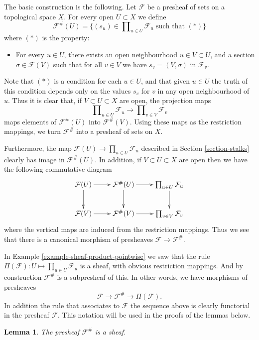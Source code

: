\documentclass{stacks-project}
\theoremstyle{plain}
\newtheorem{lemma}[subsection]{Lemma}
\theoremstyle{definition}
\theoremstyle{remark}
\numberwithin{equation}{subsection}
\begin{document}
\medskip\noindent
The basic construction is the following. Let $\mathcal{F}$ be a presheaf
of sets on a topological space $X$.
For every open $U \subset X$ we define
$$
\mathcal{F}^{\#}(U)
=
\{
(s_u) \in \prod\nolimits_{u \in U} \mathcal{F}_u
\text{ such that }(*)
\}
$$
where $(*)$ is the property:
\begin{itemize}
\item[(*)] For every $u \in U$, there exists an open neighbourhood
$u \in V \subset U$, and a section $\sigma \in \mathcal{F}(V)$
such that for all $v \in V$ we have $s_v = (V, \sigma)$
in $\mathcal{F}_v$.
\end{itemize}
Note that $(*)$ is a condition for each $u \in U$,
and that given $u \in U$ the truth of this condition
depends only on the values $s_v$ for $v$ in any open neighbourhood
of $u$. Thus it is clear that,
if $V \subset U \subset X$ are open, the projection maps
$$
\prod\nolimits_{u \in U} \mathcal{F}_u
\longrightarrow
\prod\nolimits_{v \in V} \mathcal{F}_v
$$
maps elements of $\mathcal{F}^{\#}(U)$ into $\mathcal{F}^{\#}(V)$.
Using these maps as the restriction mappings, we turn $\mathcal{F}^\#$
into a presheaf of sets on $X$.

\medskip\noindent
Furthermore, the map $\mathcal{F}(U) \to \prod_{u \in U} \mathcal{F}_u$
described in Section \ref{section-stalks} clearly has image
in $\mathcal{F}^{\#}(U)$. In addition, if $V \subset U \subset X$ are
open then we have the following commutative diagram
$$
\xymatrix{
\mathcal{F}(U) \ar[r] \ar[d] &
\mathcal{F}^{\#}(U) \ar[r] \ar[d] &
\prod_{u\in U} \mathcal{F}_u \ar[d] \\
\mathcal{F}(V) \ar[r] &
\mathcal{F}^{\#}(V) \ar[r] &
\prod_{v\in V} \mathcal{F}_v
}
$$
where the vertical maps are induced from the
restriction mappings. Thus we see that
there is a canonical morphism of presheaves
$\mathcal{F} \to \mathcal{F}^{\#}$.

\medskip\noindent
In Example \ref{example-sheaf-product-pointwise} we saw
that the rule $\Pi(\mathcal{F}) : U \mapsto \prod_{u\in U} \mathcal{F}_u$
is a sheaf, with obvious restriction mappings. And by construction
$\mathcal{F}^{\#}$ is a subpresheaf of this. In other words, we
have morphisms of presheaves
$$
\mathcal{F} \to \mathcal{F}^\# \to \Pi(\mathcal{F}).
$$
In addition the rule that associates to $\mathcal{F}$
the sequence above is clearly functorial in the presheaf $\mathcal{F}$.
This notation will be
used in the proofs of the lemmas below.

\begin{lemma}
\label{lemma-sheafification-sheaf}
The presheaf $\mathcal{F}^{\#}$ is a sheaf.
\end{lemma}
\end{document}
